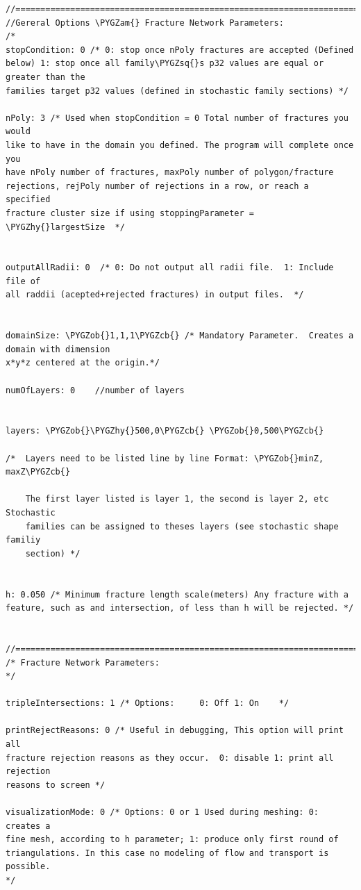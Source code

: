 \documentclass[letterpaper,10pt,english]{sphinxmanual}
\def\PYGZob{\char`\{}
\def\PYGZcb{\char`\}}
\def\PYGZam{\char`\&}
\def\PYGZhy{\char`\-}
\def\PYGZsq{\char`\'}
\renewcommand\PYGZsq{\textquotesingle}
\begin{document}
\begin{Verbatim}[commandchars=\\\{\}]
//==========================================================================
//Gereral Options \PYGZam{} Fracture Network Parameters:
/*
stopCondition: 0 /* 0: stop once nPoly fractures are accepted (Defined
below) 1: stop once all family\PYGZsq{}s p32 values are equal or greater than the
families target p32 values (defined in stochastic family sections) */

nPoly: 3 /* Used when stopCondition = 0 Total number of fractures you would
like to have in the domain you defined. The program will complete once you
have nPoly number of fractures, maxPoly number of polygon/fracture
rejections, rejPoly number of rejections in a row, or reach a specified
fracture cluster size if using stoppingParameter = \PYGZhy{}largestSize  */


outputAllRadii: 0  /* 0: Do not output all radii file.  1: Include file of
all raddii (acepted+rejected fractures) in output files.  */


domainSize: \PYGZob{}1,1,1\PYGZcb{} /* Mandatory Parameter.  Creates a domain with dimension
x*y*z centered at the origin.*/

numOfLayers: 0    //number of layers


layers: \PYGZob{}\PYGZhy{}500,0\PYGZcb{} \PYGZob{}0,500\PYGZcb{}

/*  Layers need to be listed line by line Format: \PYGZob{}minZ, maxZ\PYGZcb{}

    The first layer listed is layer 1, the second is layer 2, etc Stochastic
    families can be assigned to theses layers (see stochastic shape familiy
    section) */


h: 0.050 /* Minimum fracture length scale(meters) Any fracture with a
feature, such as and intersection, of less than h will be rejected. */


//==========================================================================//
/* Fracture Network Parameters:
*/

tripleIntersections: 1 /* Options:     0: Off 1: On    */

printRejectReasons: 0 /* Useful in debugging, This option will print all
fracture rejection reasons as they occur.  0: disable 1: print all rejection
reasons to screen */

visualizationMode: 0 /* Options: 0 or 1 Used during meshing: 0: creates a
fine mesh, according to h parameter; 1: produce only first round of
triangulations. In this case no modeling of flow and transport is possible.
*/


\end{Verbatim}
\end{document}
